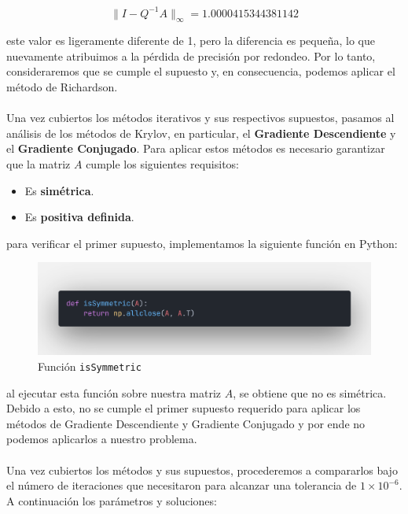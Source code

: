 \documentclass{article}
\begin{document}
  \[
  \|I-Q^{-1}A\|_\infty = 1.0000415344381142
  \]

  este valor es ligeramente diferente de 1, pero la diferencia es pequeña, lo que nuevamente atribuimos a la pérdida de precisión por redondeo. Por lo tanto, consideraremos que se cumple el supuesto y, en consecuencia, podemos aplicar el método de Richardson.

  \paragraph{}
  Una vez cubiertos los métodos iterativos y sus respectivos supuestos, pasamos al análisis de los métodos de Krylov, en particular, el \textbf{Gradiente Descendiente} y el \textbf{Gradiente Conjugado}. Para aplicar estos métodos es necesario garantizar que la matriz $A$ cumple los siguientes requisitos:

  \begin{itemize}
      \item Es \textbf{simétrica}.
      \item Es \textbf{positiva definida}.
  \end{itemize}

  para verificar el primer supuesto, implementamos la siguiente función en Python:

  \begin{figure}[H]
      \centering
      \includegraphics[width=1\textwidth]{isSymmetric.png}
      \caption{Función \texttt{isSymmetric}}
  \end{figure}

  al ejecutar esta función sobre nuestra matriz $A$, se obtiene que no es simétrica. Debido a esto, no se cumple el primer supuesto requerido para aplicar los métodos de Gradiente Descendiente y Gradiente Conjugado y por ende no podemos aplicarlos a nuestro problema.

  \paragraph{}
  Una vez cubiertos los métodos y sus supuestos, procederemos a compararlos bajo el número de iteraciones que necesitaron para alcanzar una tolerancia de $1\times10^{-6}$. A continuación los parámetros y soluciones:
\end{document}
